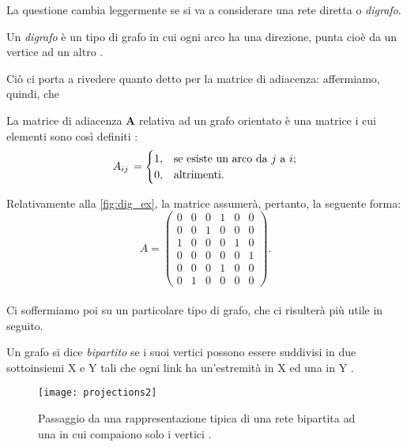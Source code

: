 La questione cambia leggermente se si va a considerare una rete diretta o \emph{digrafo}.
\begin{definizione}
Un \emph{digrafo} è un tipo di grafo in cui ogni arco ha una direzione, punta cioè da un vertice ad un altro \cite{Newman}.
\end{definizione}
Ciò ci porta a rivedere quanto detto per la matrice di adiacenza: affermiamo, quindi, che
\begin{definizione}
La matrice di adiacenza \textbf{A} relativa ad un grafo orientato è una matrice i cui elementi sono così definiti \cite{Newman}:
\[
A_{ij} \, =
\begin{cases}
1, & \text{se esiste un arco da $ j $ a $ i $};\\ 
0, & \text{altrimenti}.
\end{cases}
\]
\end{definizione}

Relativamente alla \cref{fig:dig_ex}, la matrice assumerà, pertanto, la seguente forma: \\
\begin{equation}
A =
\begin{pmatrix}
0 & 0 & 0 & 1 & 0 & 0 \\
0 & 0 & 1 & 0 & 0 & 0 \\
1 & 0 & 0 & 0 & 1 & 0 \\
0 & 0 & 0 & 0 & 0 & 1 \\
0 & 0 & 0 & 1 & 0 & 0 \\
0 & 1 & 0 & 0 & 0 & 0
\end{pmatrix} .
\end{equation}
\\
Ci soffermiamo poi su un particolare tipo di grafo, che ci risulterà più utile in seguito.
\begin{definizione} 
Un grafo si dice \emph{bipartito} se i suoi vertici possono essere suddivisi in due sottoinsiemi X e Y tali che ogni link ha un'estremità in X ed una in Y \cite{Bondy}. 
\end{definizione}
\begin{figure}[h]
	\begin{center}
		\texttt{[image: projections2]}
		\caption{Passaggio da una rappresentazione tipica di una rete bipartita ad una in cui compaiono solo i vertici \cite{Newman}.}
		\label{fig:proj2}
	\end{center}
\end{figure}

